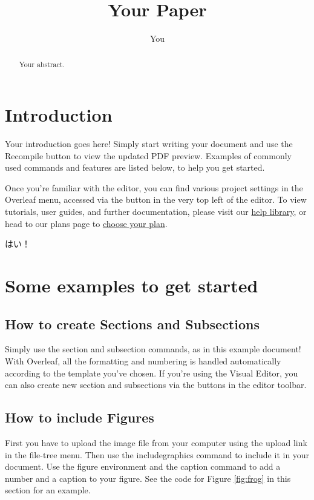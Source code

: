\documentclass{article}
\title{Your Paper}
\author{You}
\begin{document}
	\maketitle

	\begin{abstract}
		Your abstract.
	\end{abstract}

	\section{Introduction}

	Your introduction goes here! Simply start writing your document and use the Recompile
	button to view the updated PDF preview. Examples of commonly used commands
	and features are listed below, to help you get started.

	Once you're familiar with the editor, you can find various project settings
	in the Overleaf menu, accessed via the button in the very top left of the editor.
	To view tutorials, user guides, and further documentation, please visit our \href{https://www.overleaf.com/learn}{help
	library}, or head to our plans page to
	\href{https://www.overleaf.com/user/subscription/plans}{choose your plan}.

	はい！

	\section{Some examples to get started}

	\subsection{How to create Sections and Subsections}

	Simply use the section and subsection commands, as in this example document!
	With Overleaf, all the formatting and numbering is handled automatically
	according to the template you've chosen. If you're using the Visual Editor,
	you can also create new section and subsections via the buttons in the
	editor toolbar.

	\subsection{How to include Figures}

	First you have to upload the image file from your computer using the upload link
	in the file-tree menu. Then use the includegraphics command to include it in
	your document. Use the figure environment and the caption command to add a number
	and a caption to your figure. See the code for Figure \ref{fig:frog} in this
	section for an example.
\end{document}
